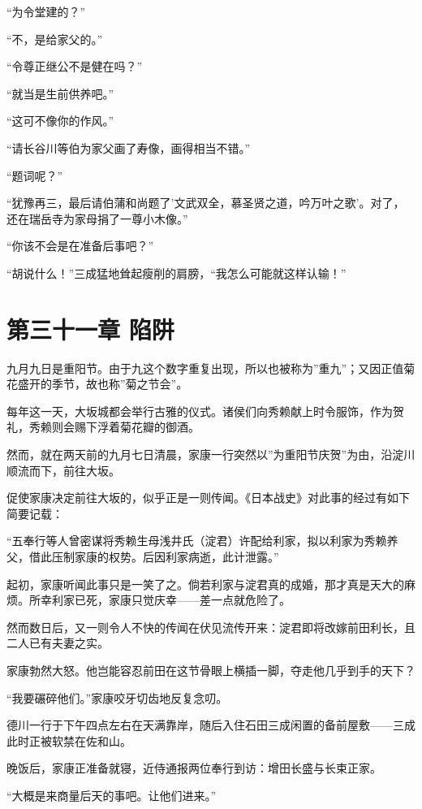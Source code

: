 \documentclass[
]{book}
\begin{document}
``为令堂建的？''

``不，是给家父的。''

``令尊正继公不是健在吗？''

``就当是生前供养吧。''

``这可不像你的作风。''

``请长谷川等伯为家父画了寿像，画得相当不错。''

``题词呢？''

``犹豫再三，最后请伯蒲和尚题了'文武双全，慕圣贤之道，吟万叶之歌'。对了，还在瑞岳寺为家母捐了一尊小木像。''

``你该不会是在准备后事吧？''

``胡说什么！''三成猛地耸起瘦削的肩膀，``我怎么可能就这样认输！''

\chapter*{第三十一章 陷阱}\label{ux7b2cux4e09ux5341ux4e00ux7ae0-ux9677ux9631}

九月九日是重阳节。由于九这个数字重复出现，所以也被称为''重九''；又因正值菊花盛开的季节，故也称''菊之节会''。

每年这一天，大坂城都会举行古雅的仪式。诸侯们向秀赖献上时令服饰，作为贺礼，秀赖则会赐下浮着菊花瓣的御酒。

然而，就在两天前的九月七日清晨，家康一行突然以''为重阳节庆贺''为由，沿淀川顺流而下，前往大坂。

促使家康决定前往大坂的，似乎正是一则传闻。《日本战史》对此事的经过有如下简要记载：

``五奉行等人曾密谋将秀赖生母浅井氏（淀君）许配给利家，拟以利家为秀赖养父，借此压制家康的权势。后因利家病逝，此计泄露。''

起初，家康听闻此事只是一笑了之。倘若利家与淀君真的成婚，那才真是天大的麻烦。所幸利家已死，家康只觉庆幸------差一点就危险了。

然而数日后，又一则令人不快的传闻在伏见流传开来：淀君即将改嫁前田利长，且二人已有夫妻之实。

家康勃然大怒。他岂能容忍前田在这节骨眼上横插一脚，夺走他几乎到手的天下？

``我要碾碎他们。''家康咬牙切齿地反复念叨。

德川一行于下午四点左右在天满靠岸，随后入住石田三成闲置的备前屋敷------三成此时正被软禁在佐和山。

晚饭后，家康正准备就寝，近侍通报两位奉行到访：增田长盛与长束正家。

``大概是来商量后天的事吧。让他们进来。''
\end{document}
